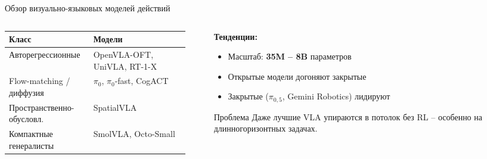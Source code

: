 \documentclass[aspectratio=169,13pt]{beamer}
\begin{document}
\begin{frame}{Обзор визуально-языковых моделей действий}
  \begin{columns}[T]
    \begin{column}{0.5\textwidth}
      \footnotesize
      \setlength{\tabcolsep}{3pt}
      \begin{tabular}{p{0.42\linewidth}p{0.50\linewidth}}
        \toprule
        \textbf{Класс} & \textbf{Модели} \\
        \midrule
        Авторегрессионные & OpenVLA-OFT, UniVLA, RT-1-X \\[2pt]
        Flow-matching / диффузия & $\pi_0$, $\pi_0$-fast, CogACT \\[2pt]
        Пространственно-обусловл. & SpatialVLA \\[2pt]
        Компактные генералисты & SmolVLA, Octo-Small \\
        \bottomrule
      \end{tabular}
    \end{column}
    \begin{column}{0.48\textwidth}
      \small\textbf{Тенденции:}
      \begin{itemize}\setlength\itemsep{2pt}\small
        \item Масштаб: \textbf{35M -- 8B} параметров
        \item Открытые модели догоняют закрытые
        \item Закрытые ($\pi_{0{,}5}$, Gemini Robotics) лидируют
      \end{itemize}
      \vspace{3pt}
      \begin{alertblock}{Проблема}
        \small Даже лучшие VLA упираются в потолок без RL -- особенно на длинногоризонтных задачах.
      \end{alertblock}
    \end{column}
  \end{columns}
\end{frame}
\end{document}

